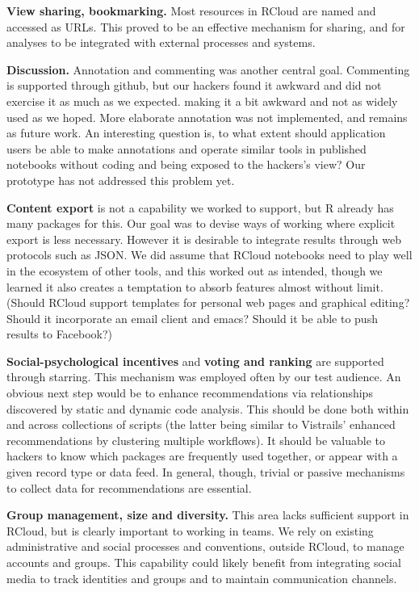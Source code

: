 {\bf View sharing, bookmarking.} Most resources in RCloud are named
and accessed as URLs. This proved to be an effective mechanism for
sharing, and for analyses to be integrated with external processes
and systems.

{\bf Discussion.} Annotation and commenting was another central goal.
Commenting is supported through github, but our hackers found it
awkward and did not exercise it as much as we expected.
making it a bit awkward and
not as widely used as we hoped.  More elaborate annotation was not
implemented, and remains as future work.
An interesting question is, to what extent should application users
be able to make annotations and operate similar tools in published
notebooks without coding and being exposed to the hackers's view?
Our prototype has not addressed this problem yet.

{\bf Content export} is not a capability we worked to support,
but R already has many packages for this. Our goal was to devise
ways of working where explicit export is less necessary.
However it is desirable to integrate results
through web protocols such as JSON. We did assume that RCloud
notebooks need to play well in the ecosystem of other tools,
and this worked out as intended, though we learned it also creates
a temptation to absorb features almost without limit. (Should
RCloud support templates for personal web pages and graphical
editing? Should it incorporate an email client and emacs?
Should it be able to push results to Facebook?)

{\bf Social-psychological incentives} and {\bf voting and ranking}
are supported through starring. This mechanism was employed often
by our test audience. An obvious next step would be to enhance
recommendations via relationships discovered by static and
dynamic code analysis. This should be done both within and across
collections of scripts (the latter being similar to Vistrails'
enhanced recommendations by clustering multiple workflows).
It should be valuable to hackers to know which packages are
frequently used together, or appear with a given record type
or data feed. In general, though, trivial or passive mechanisms
to collect data for recommendations are essential.

{\bf Group management, size and diversity.} This area lacks sufficient
support in RCloud, but is clearly important to working in teams.
We rely on existing administrative and social processes and conventions,
outside RCloud, to manage accounts and groups. This capability
could likely benefit from integrating social media to track
identities and groups and to maintain communication channels.

